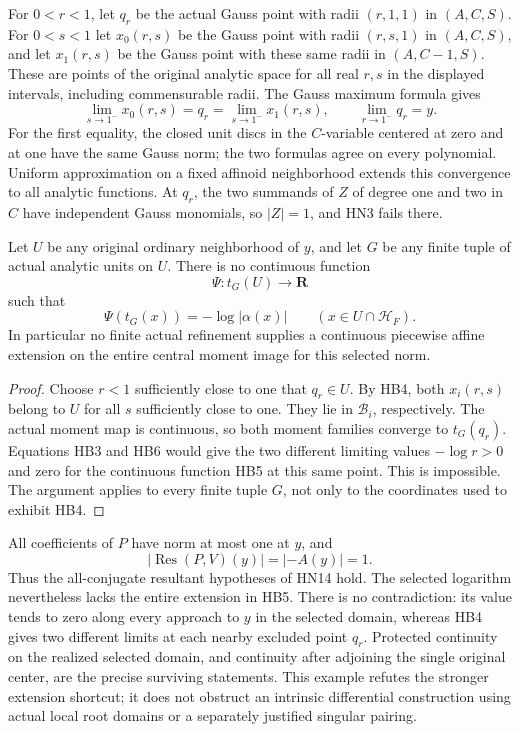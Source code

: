 For \(0<r<1\), let \(q_r\) be the actual Gauss point
with radii \((r,1,1)\) in \((A,C,S)\).  For \(0<s<1\)
let \(x_0(r,s)\) be the Gauss point with radii
\((r,s,1)\) in \((A,C,S)\), and let \(x_1(r,s)\) be
the Gauss point with these same radii in \((A,C-1,S)\).
These are points of the original analytic space for all
real \(r,s\) in the displayed intervals, including
commensurable radii.  The Gauss maximum formula gives
\[
 \lim_{s\to1^-}x_0(r,s)=q_r
       =\lim_{s\to1^-}x_1(r,s),
       \qquad \lim_{r\to1^-}q_r=y.
\tag{HB4}
\]
For the first equality, the closed unit discs in the
\(C\)-variable centered at zero and at one have the
same Gauss norm; the two formulas agree on every
polynomial.  Uniform approximation on a fixed affinoid
neighborhood extends this convergence to all analytic
functions.  At \(q_r\), the two summands of \(Z\) of
degree one and two in \(C\) have independent Gauss
monomials, so \(|Z|=1\), and HN3 fails there.

\begin{theorem}
\label{thm:r13-hensel-no-entire-central-continuous-extension}
Let \(U\) be any original ordinary neighborhood of
\(y\), and let \(G\) be any finite tuple of actual
analytic units on \(U\).  There is no continuous
function
\[
                     \Psi:t_G(U)\longrightarrow\mathbf R
\tag{HB5}
\]
such that
\[
             \Psi(t_G(x))=-\log|\alpha(x)|
                     \qquad(x\in U\cap\mathcal H_F).
\tag{HB6}
\]
In particular no finite actual refinement supplies a
continuous piecewise affine extension on the entire
central moment image for this selected norm.
\end{theorem}

\begin{proof}
Choose \(r<1\) sufficiently close to one that
\(q_r\in U\).  By HB4, both \(x_i(r,s)\) belong
to \(U\) for all \(s\) sufficiently close to one.
They lie in \(\mathcal B_i\), respectively.  The
actual moment map is continuous, so both moment
families converge to \(t_G(q_r)\).  Equations
HB3 and HB6 would give the two different limiting
values \(-\log r>0\) and zero for the continuous
function HB5 at this same point.  This is impossible.
The argument applies to every finite tuple \(G\),
not only to the coordinates used to exhibit HB4.
\end{proof}

All coefficients of \(P\) have norm at most one
at \(y\), and
\[
                         |\operatorname{Res}(P,V)(y)|
                              =|-A(y)|=1.
\tag{HB7}
\]
Thus the all-conjugate resultant hypotheses of HN14
hold.  The selected logarithm nevertheless lacks the
entire extension in HB5.  There is no contradiction:
its value tends to zero along every approach to
\(y\) in the selected domain, whereas HB4 gives
two different limits at each nearby excluded point
\(q_r\).  Protected continuity on the realized
selected domain, and continuity after adjoining the
single original center, are the precise surviving
statements.  This example refutes the stronger
extension shortcut; it does not obstruct an intrinsic
differential construction using actual local root
domains or a separately justified singular pairing.
